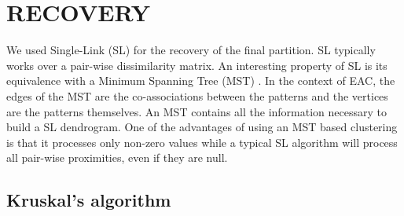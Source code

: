 \section{\uppercase{Recovery}}
\label{sec:recovery}



\noindent We used Single-Link (SL) for the recovery of the final partition.
SL typically works over a pair-wise dissimilarity matrix.
An interesting property of SL is its equivalence with a Minimum Spanning Tree (MST) \cite{Gower1969}.
In the context of EAC, the edges of the MST are the co-associations between the patterns and the vertices are the patterns themselves. %
An MST contains all the information necessary to build a SL dendrogram.
One of the advantages of using an MST based clustering is that it processes only non-zero values while a typical SL algorithm will process all pair-wise proximities, even if they are null.

\subsection{Kruskal's algorithm} %

